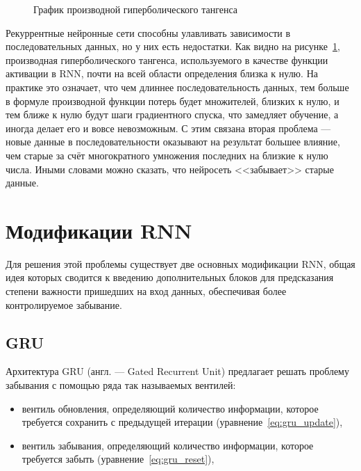 \begin{figure}[h]
    \centering
    \caption{График производной гиперболического тангенса}
    \label{fig:tanh_der}
\end{figure}

Рекуррентные нейронные сети способны улавливать зависимости в последовательных данных, но у них есть недостатки. Как видно на рисунке \ref*{fig:tanh_der}, производная гиперболического тангенса, используемого в качестве функции активации в RNN, почти на всей области определения близка к нулю. На практике это означает, что чем длиннее последовательность данных, тем больше в формуле производной функции потерь будет множителей, близких к нулю, и тем ближе к нулю будут шаги градиентного спуска, что замедляет обучение, а иногда делает его и вовсе невозможным. С этим связана вторая проблема --- новые данные в последовательности оказывают на результат большее влияние, чем старые за счёт многократного умножения последних на близкие к нулю числа. Иными словами можно сказать, что нейросеть <<забывает>> старые данные.

\section{Модификации RNN}

Для решения этой проблемы существует две основных модификации RNN, общая идея которых сводится к введению дополнительных блоков для предсказания степени важности пришедших на вход данных, обеспечивая более контролируемое забывание.

\subsection{GRU}

Архитектура GRU (англ. --- Gated Recurrent Unit) предлагает решать проблему забывания с помощью ряда так называемых вентилей:
\begin{itemize}
    \item вентиль обновления, определяющий количество информации, которое требуется сохранить с предыдущей итерации (уравнение \ref*{eq:gru_update}),
    \item вентиль забывания, определяющий количество информации, которое требуется забыть (уравнение \ref*{eq:gru_reset}),
\end{itemize}

